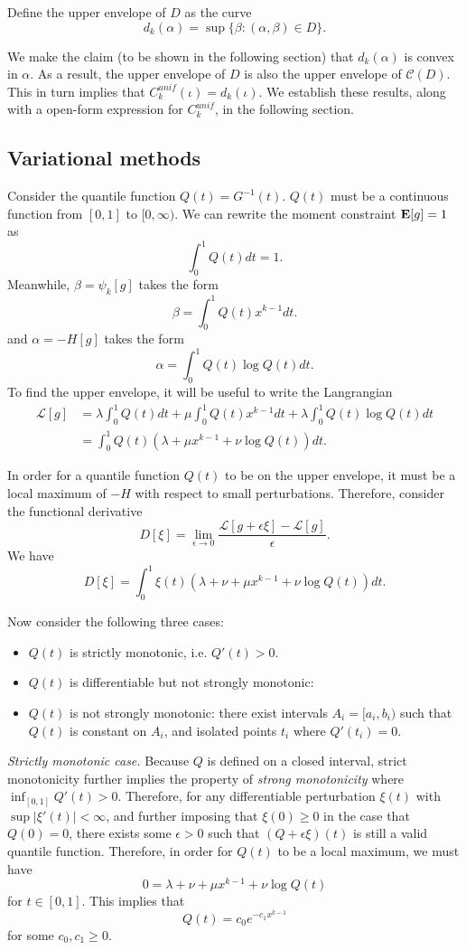 \documentclass[12pt]{article}
\begin{document}
Define the upper envelope of $D$ as the curve
\[
d_k(\alpha) = \sup\{\beta: (\alpha, \beta) \in D\}.
\]

We make the claim (to be shown in the following section) that $d_k(\alpha)$ is convex in $\alpha$.
As a result, the upper envelope of $D$ is also the upper envelope of $\mathcal{C}(D)$.
This in turn implies that $C_k^{unif}(\iota) = d_k(\iota)$.
We establish these results, along with a open-form expression for $C_k^{unif}$, in the following section.

\subsection{Variational methods}

Consider the quantile function $Q(t) = G^{-1}(t).$  $Q(t)$ must be a continuous function from $[0,1]$ to $[0,\infty).$
We can rewrite the moment constraint $\textbf{E}[g]=1$ as
\[
\int_0^1 Q(t) dt = 1.
\]
Meanwhile, $\beta = \psi_k[g]$ takes the form
\[
\beta = \int_0^1 Q(t) x^{k-1} dt.
\]
and $\alpha = -H[g]$ takes the form
\[
\alpha = \int_0^1 Q(t) \log Q(t) dt.
\]
To find the upper envelope, it will be useful to write the Langrangian
\begin{align*}
\mathcal{L}[g] &= \lambda \int_0^1 Q(t) dt + \mu \int_0^1 Q(t) x^{k-1} dt + \lambda \int_0^1 Q(t) \log Q(t) dt
\\&= \int_0^1 Q(t) (\lambda + \mu x^{k-1} + \nu \log Q(t)) dt.
\end{align*}

In order for a quantile function $Q(t)$ to be on the upper envelope, it must be a local maximum of $-H$ with respect to small perturbations.  Therefore, consider the functional derivative
\[
D[\xi] = \lim_{\epsilon \to 0} \frac{\mathcal{L}[g + \epsilon \xi] - \mathcal{L}[g]}{\epsilon}.
\]
We have
\[
D[\xi] = \int_0^1 \xi(t) (\lambda + \nu  + \mu x^{k-1} + \nu \log Q(t)) dt.
\]

Now consider the following three cases:
\begin{itemize}
\item $Q(t)$ is strictly monotonic, i.e. $Q'(t) > 0.$
\item $Q(t)$ is differentiable but not strongly monotonic: 
\item $Q(t)$ is not strongly monotonic: there exist intervals $A_i = [a_i, b_i)$ such that $Q(t)$ is constant on $A_i$,
and isolated points $t_i$ where $Q'(t_i) = 0.$
\end{itemize}

\emph{Strictly monotonic case.}  Because $Q$ is defined on a closed interval,
strict monotonicity further implies the property of \emph{strong monotonicity} where 
$\inf_[0,1] Q'(t) > 0.$  Therefore, for any differentiable perturbation $\xi(t)$ with $\sup |\xi'(t)| <\infty$,
and further imposing that $\xi(0) \geq 0$ in the case that $Q(0) = 0$,
there exists some $\epsilon >0$ such that $(Q + \epsilon \xi)(t)$ is still a valid quantile function.
Therefore, in order for $Q(t)$ to be a local maximum, we must have
\[
0 = \lambda + \nu  + \mu x^{k-1} + \nu \log Q(t)
\]
for $t \in [0,1]$.  This implies that
\[
Q(t) = c_0 e^{-c_1 x^{k-1}}
\]
for some $c_0, c_1 \geq 0$.
\end{document}
